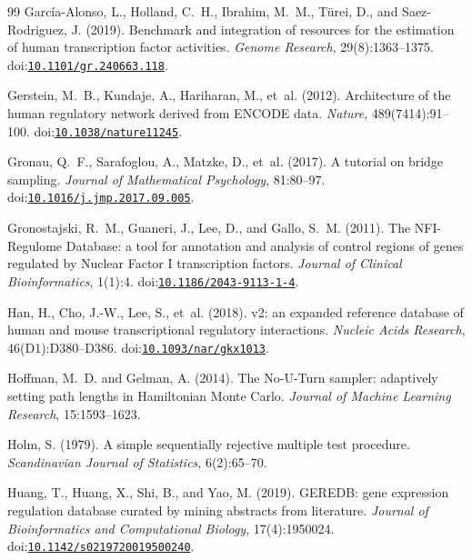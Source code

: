 \documentclass[11pt,a4paper]{article}
\begin{document}
\begin{thebibliography}{99}
Garc{\'i}a-Alonso, L., Holland, C.~H., Ibrahim, M.~M., T{\"u}rei, D., and Saez-Rodriguez, J. (2019).
\newblock Benchmark and integration of resources for the estimation of human transcription factor activities.
\newblock \emph{Genome Research}, 29(8):1363--1375.
\newblock doi:\href{https://doi.org/10.1101/gr.240663.118}{\nolinkurl{10.1101/gr.240663.118}}.

Gerstein, M.~B., Kundaje, A., Hariharan, M., et~al. (2012).
\newblock Architecture of the human regulatory network derived from {ENCODE} data.
\newblock \emph{Nature}, 489(7414):91--100.
\newblock doi:\href{https://doi.org/10.1038/nature11245}{\nolinkurl{10.1038/nature11245}}.

Gronau, Q.~F., Sarafoglou, A., Matzke, D., et~al. (2017).
\newblock A tutorial on bridge sampling.
\newblock \emph{Journal of Mathematical Psychology}, 81:80--97.
\newblock doi:\href{https://doi.org/10.1016/j.jmp.2017.09.005}{\nolinkurl{10.1016/j.jmp.2017.09.005}}.

Gronostajski, R.~M., Guaneri, J., Lee, D., and Gallo, S.~M. (2011).
\newblock The NFI-Regulome Database: a tool for annotation and analysis of control regions of genes regulated by Nuclear Factor I transcription factors.
\newblock \emph{Journal of Clinical Bioinformatics}, 1(1):4.
\newblock doi:\href{https://doi.org/10.1186/2043-9113-1-4}{\nolinkurl{10.1186/2043-9113-1-4}}.

Han, H., Cho, J.-W., Lee, S., et~al. (2018).
 v2: an expanded reference database of human and mouse transcriptional regulatory interactions.
\newblock \emph{Nucleic Acids Research}, 46(D1):D380--D386.
\newblock doi:\href{https://doi.org/10.1093/nar/gkx1013}{\nolinkurl{10.1093/nar/gkx1013}}.

Hoffman, M.~D. and Gelman, A. (2014).
\newblock The No-U-Turn sampler: adaptively setting path lengths in {H}amiltonian {M}onte {C}arlo.
\newblock \emph{Journal of Machine Learning Research}, 15:1593--1623.

Holm, S. (1979).
\newblock A simple sequentially rejective multiple test procedure.
\newblock \emph{Scandinavian Journal of Statistics}, 6(2):65--70.

Huang, T., Huang, X., Shi, B., and Yao, M. (2019).
\newblock GEREDB: gene expression regulation database curated by mining abstracts from literature.
\newblock \emph{Journal of Bioinformatics and Computational Biology}, 17(4):1950024.
\newblock doi:\href{https://doi.org/10.1142/s0219720019500240}{\nolinkurl{10.1142/s0219720019500240}}.


\end{thebibliography}
\end{document}
